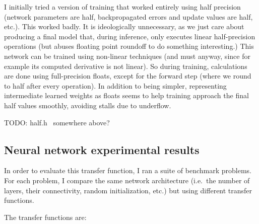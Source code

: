 \documentclass[twocolumn]{article}
\begin{document}
I initially tried a version of training that worked entirely using
half precision (network parameters are half, backpropagated errors and
update values are half, etc.). This worked badly. It is ideologically
unnecessary, as we just care about producing a final model that,
during inference, only executes linear half-precision operations (but
abuses floating point roundoff to do something interesting.) This
network can be trained using non-linear techniques (and must anyway,
since for example its computed derivative is not linear). So during
training, calculations are done using full-precision floats, except
for the forward step (where we round to half after every operation).
In addition to being simpler, representing intermediate learned
weights as floats seems to help training approach the final half
values smoothly, avoiding stalls due to underflow.

TODO: half.h~\cite{half} somewhere above?

\subsection{Neural network experimental results}
In order to evaluate this transfer function, I ran a suite of
benchmark problems. For each problem, I compare the same network
architecture (i.e.~the number of layers, their connectivity, random
initialization, etc.) but using different transfer functions.

The transfer functions are:
\end{document}
